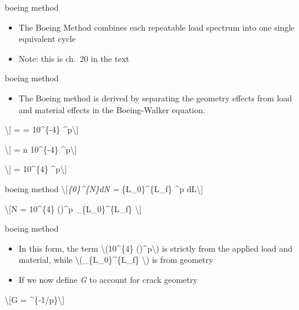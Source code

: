 \documentclass[
  letterpaper,
  ignorenonframetext,
  aspectratio=43,
  handout,
  12pt]{beamer}
\providecommand{\tightlist}{%
  \setlength{\itemsep}{0pt}\setlength{\parskip}{0pt}}
\providecommand{\tightlist}{%
\setlength{\itemsep}{0pt}\setlength{\parskip}{0pt}}
\begin{document}
\begin{frame}{boeing method}
\protect\hypertarget{boeing-method-2}{}
\begin{itemize}
\tightlist
\item
  The Boeing Method combines each repeatable load spectrum into one
  single equivalent cycle
\item
  Note: this is ch.~20 in the text
\end{itemize}
\end{frame}

\begin{frame}{boeing method}
\protect\hypertarget{boeing-method-3}{}
\begin{itemize}
\tightlist
\item
  The Boeing method is derived by separating the geometry effects from
  load and material effects in the Boeing-Walker equation.
\end{itemize}

\textbackslash{[} =  =
10\^{}\{-4\} \^{}p\textbackslash{]}

\textbackslash{[} = n 10\^{}\{-4\}
\^{}p\textbackslash{]}

\textbackslash{[} =  10\^{}\{4\}
\^{}p\textbackslash{]}
\end{frame}

\begin{frame}{boeing method}
\protect\hypertarget{boeing-method-4}{}
\textbackslash{[}\int\emph{\{0\}\^{}\{N\}dN = 
\int}\{L\_0\}\^{}\{L\_f\} \^{}p
dL\textbackslash{]}

\textbackslash{[}N = 10\^{}\{4\}
\left(\right)\^{}p \int\_\{L\_0\}\^{}\{L\_f\}
\textbackslash{]}
\end{frame}

\begin{frame}{boeing method}
\protect\hypertarget{boeing-method-5}{}
\begin{itemize}
\tightlist
\item
  In this form, the term \textbackslash(10\^{}\{4\}
  \left(\right)\^{}p\textbackslash) is strictly
  from the applied load and material, while
  \textbackslash(\int\_\{L\_0\}\^{}\{L\_f\}
  \textbackslash) is from
  geometry
\item
  If we now define \emph{G} to account for crack geometry
\end{itemize}

\textbackslash{[}G =
 \^{}\{-1/p\}\textbackslash{]}
\end{frame}
\end{document}
